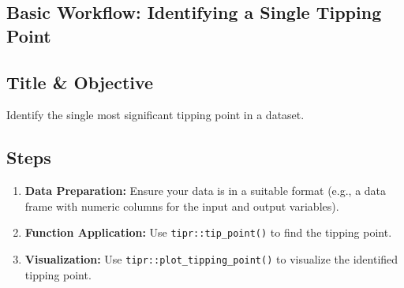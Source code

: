 \documentclass[
  10pt,
  letterpaper,
  DIV=11,
  numbers=noendperiod]{scrartcl}
\providecommand{\tightlist}{%
  \setlength{\itemsep}{0pt}\setlength{\parskip}{0pt}}
\begin{document}
\subsection{Basic Workflow: Identifying a Single Tipping
Point}\label{basic-workflow-identifying-a-single-tipping-point}

\subsection{Title \& Objective}\label{title-objective}

Identify the single most significant tipping point in a dataset.

\subsection{Steps}\label{steps}

\begin{enumerate}
\def\labelenumi{\arabic{enumi}.}
\tightlist
\item
  \textbf{Data Preparation:} Ensure your data is in a suitable format
  (e.g., a data frame with numeric columns for the input and output
  variables).
\item
  \textbf{Function Application:} Use \texttt{tipr::tip\_point()} to find
  the tipping point.
\item
  \textbf{Visualization:} Use \texttt{tipr::plot\_tipping\_point()} to
  visualize the identified tipping point.
\end{enumerate}
\end{document}
